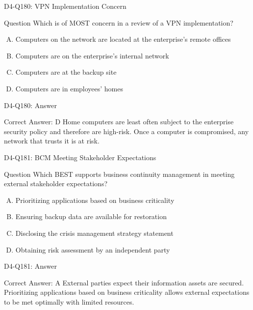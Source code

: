 \documentclass{beamer}
\begin{document}
	\begin{frame}{D4-Q180: VPN Implementation Concern}
		\begin{block}{Question}
			Which is of MOST concern in a review of a VPN implementation?
		\end{block}
		\begin{enumerate}[(A)]
			\item Computers on the network are located at the enterprise's remote offices
			\item Computers are on the enterprise's internal network
			\item Computers are at the backup site
			\item Computers are in employees' homes
		\end{enumerate}
	\end{frame}
	\begin{frame}{D4-Q180: Answer}
		\begin{block}{Correct Answer: D}
			Home computers are least often subject to the enterprise security policy and therefore are high-risk. Once a computer is compromised, any network that trusts it is at risk.
		\end{block}
	\end{frame}
	
	\begin{frame}{D4-Q181: BCM Meeting Stakeholder Expectations}
		\begin{block}{Question}
			Which BEST supports business continuity management in meeting external stakeholder expectations?
		\end{block}
		\begin{enumerate}[(A)]
			\item Prioritizing applications based on business criticality
			\item Ensuring backup data are available for restoration
			\item Disclosing the crisis management strategy statement
			\item Obtaining risk assessment by an independent party
		\end{enumerate}
	\end{frame}
	\begin{frame}{D4-Q181: Answer}
		\begin{block}{Correct Answer: A}
			External parties expect their information assets are secured. Prioritizing applications based on business criticality allows external expectations to be met optimally with limited resources.
		\end{block}
	\end{frame}
	
\end{document}
